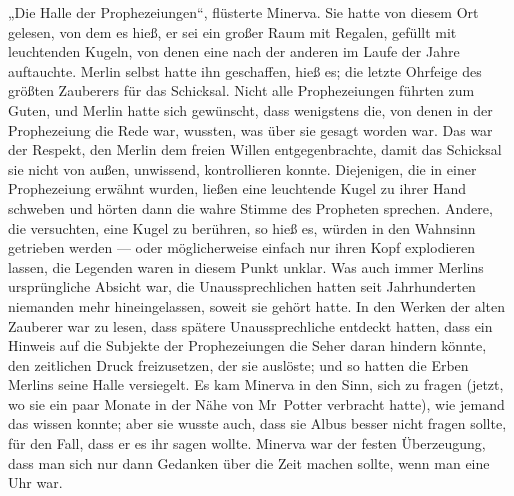 „Die Halle der Prophezeiungen“, flüsterte Minerva. Sie hatte von diesem Ort gelesen, von dem es hieß, er sei ein großer Raum mit Regalen, gefüllt mit leuchtenden Kugeln, von denen eine nach der anderen im Laufe der Jahre auftauchte. Merlin selbst hatte ihn geschaffen, hieß es; die letzte Ohrfeige des größten Zauberers für das Schicksal. Nicht alle Prophezeiungen führten zum Guten, und Merlin hatte sich gewünscht, dass wenigstens die, von denen in der Prophezeiung die Rede war, wussten, was über sie gesagt worden war. Das war der Respekt, den Merlin dem freien Willen entgegenbrachte, damit das Schicksal sie nicht von außen, unwissend, kontrollieren konnte. Diejenigen, die in einer Prophezeiung erwähnt wurden, ließen eine leuchtende Kugel zu ihrer Hand schweben und hörten dann die wahre Stimme des Propheten sprechen. Andere, die versuchten, eine Kugel zu berühren, so hieß es, würden in den Wahnsinn getrieben werden — oder möglicherweise einfach nur ihren Kopf explodieren lassen, die Legenden waren in diesem Punkt unklar. Was auch immer Merlins ursprüngliche Absicht war, die Unaussprechlichen hatten seit Jahrhunderten niemanden mehr hineingelassen, soweit sie gehört hatte. In den Werken der alten Zauberer war zu lesen, dass spätere Unaussprechliche entdeckt hatten, dass ein Hinweis auf die Subjekte der Prophezeiungen die Seher daran hindern könnte, den zeitlichen Druck freizusetzen, der sie auslöste; und so hatten die Erben Merlins seine Halle versiegelt. Es kam Minerva in den Sinn, sich zu fragen (jetzt, wo sie ein paar Monate in der Nähe von Mr~Potter verbracht hatte), wie jemand das wissen konnte; aber sie wusste auch, dass sie Albus besser nicht fragen sollte, für den Fall, dass er es ihr sagen wollte. Minerva war der festen Überzeugung, dass man sich nur dann Gedanken über die Zeit machen sollte, wenn man eine Uhr war.

